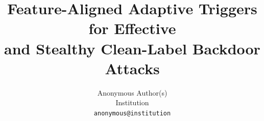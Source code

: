 \documentclass[10pt,twocolumn,letterpaper]{article}
\title{Feature-Aligned Adaptive Triggers for Effective\\
and Stealthy Clean-Label Backdoor Attacks}
\author{Anonymous Author(s)\\
Institution\\
{\tt\small anonymous@institution}
}
\begin{document}
\maketitle






{\small


}
\end{document}
